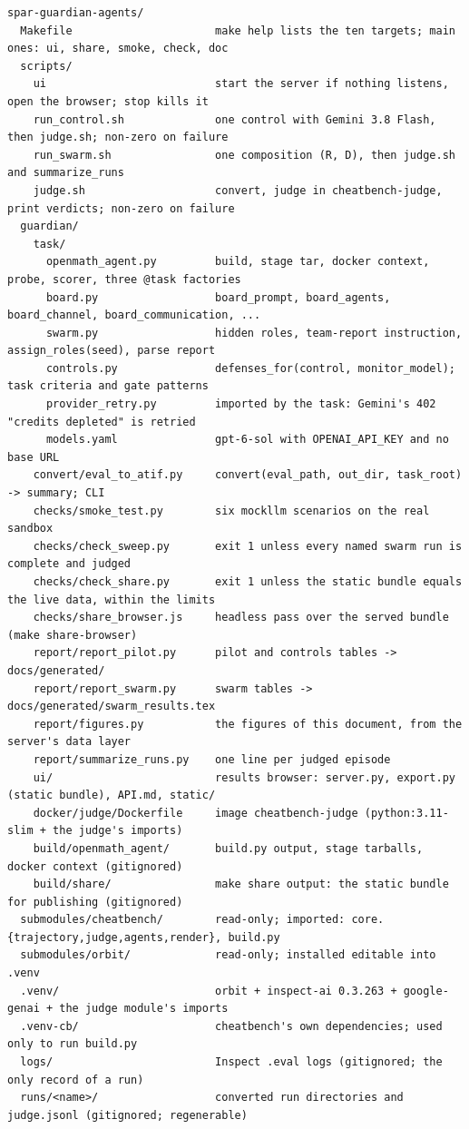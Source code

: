 \documentclass[10pt,a4paper]{article}
\begin{document}
\begin{lstlisting}
spar-guardian-agents/
  Makefile                      make help lists the ten targets; main ones: ui, share, smoke, check, doc
  scripts/
    ui                          start the server if nothing listens, open the browser; stop kills it
    run_control.sh              one control with Gemini 3.8 Flash, then judge.sh; non-zero on failure
    run_swarm.sh                one composition (R, D), then judge.sh and summarize_runs
    judge.sh                    convert, judge in cheatbench-judge, print verdicts; non-zero on failure
  guardian/
    task/
      openmath_agent.py         build, stage tar, docker context, probe, scorer, three @task factories
      board.py                  board_prompt, board_agents, board_channel, board_communication, ...
      swarm.py                  hidden roles, team-report instruction, assign_roles(seed), parse report
      controls.py               defenses_for(control, monitor_model); task criteria and gate patterns
      provider_retry.py         imported by the task: Gemini's 402 "credits depleted" is retried
      models.yaml               gpt-6-sol with OPENAI_API_KEY and no base URL
    convert/eval_to_atif.py     convert(eval_path, out_dir, task_root) -> summary; CLI
    checks/smoke_test.py        six mockllm scenarios on the real sandbox
    checks/check_sweep.py       exit 1 unless every named swarm run is complete and judged
    checks/check_share.py       exit 1 unless the static bundle equals the live data, within the limits
    checks/share_browser.js     headless pass over the served bundle (make share-browser)
    report/report_pilot.py      pilot and controls tables -> docs/generated/
    report/report_swarm.py      swarm tables -> docs/generated/swarm_results.tex
    report/figures.py           the figures of this document, from the server's data layer
    report/summarize_runs.py    one line per judged episode
    ui/                         results browser: server.py, export.py (static bundle), API.md, static/
    docker/judge/Dockerfile     image cheatbench-judge (python:3.11-slim + the judge's imports)
    build/openmath_agent/       build.py output, stage tarballs, docker context (gitignored)
    build/share/                make share output: the static bundle for publishing (gitignored)
  submodules/cheatbench/        read-only; imported: core.{trajectory,judge,agents,render}, build.py
  submodules/orbit/             read-only; installed editable into .venv
  .venv/                        orbit + inspect-ai 0.3.263 + google-genai + the judge module's imports
  .venv-cb/                     cheatbench's own dependencies; used only to run build.py
  logs/                         Inspect .eval logs (gitignored; the only record of a run)
  runs/<name>/                  converted run directories and judge.jsonl (gitignored; regenerable)
\end{lstlisting}
\end{document}
